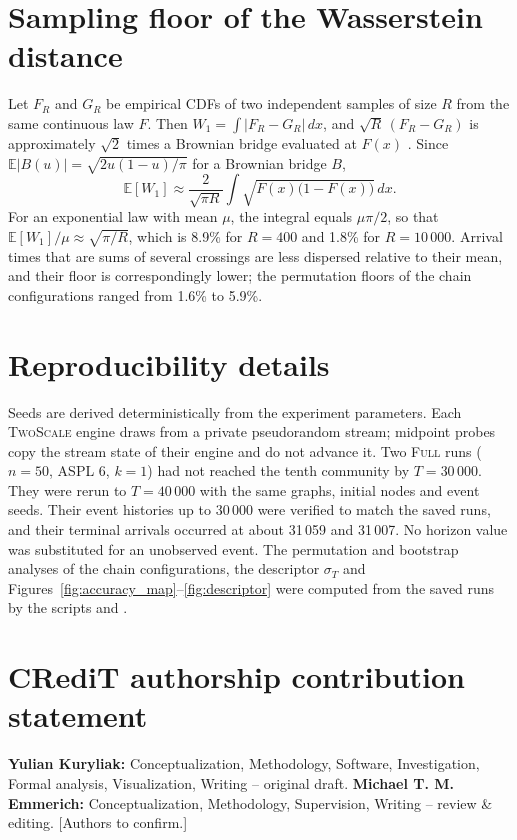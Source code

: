 \documentclass[a4paper,fleqn]{cas-sc}
\newcommand{\Full}{\textup{\textsc{Full}}}
\newcommand{\TS}{\textup{\textsc{TwoScale}}}
\begin{document}
\clearpage
\section{Sampling floor of the Wasserstein distance}
\label{app:floor}

Let $F_R$ and $G_R$ be empirical CDFs of two independent samples of size $R$ from the same continuous law $F$. Then $W_1=\int|F_R-G_R|\,dx$, and $\sqrt{R}\,(F_R-G_R)$ is approximately $\sqrt{2}$ times a Brownian bridge evaluated at $F(x)$ \citep{delbarrio1999}. Since $\mathbb{E}|B(u)|=\sqrt{2u(1-u)/\pi}$ for a Brownian bridge $B$,
\[
\mathbb{E}[W_1]\approx\frac{2}{\sqrt{\pi R}}\int\sqrt{F(x)\bigl(1-F(x)\bigr)}\,dx .
\]
For an exponential law with mean $\mu$, the integral equals $\mu\pi/2$, so that $\mathbb{E}[W_1]/\mu\approx\sqrt{\pi/R}$, which is 8.9\% for $R=400$ and 1.8\% for $R=10\,000$. Arrival times that are sums of several crossings are less dispersed relative to their mean, and their floor is correspondingly lower; the permutation floors of the chain configurations ranged from 1.6\% to 5.9\%.

\clearpage
\section{Reproducibility details}
\label{app:repro}

Seeds are derived deterministically from the experiment parameters. Each \TS{} engine draws from a private pseudorandom stream; midpoint probes copy the stream state of their engine and do not advance it. Two \Full{} runs ($n=50$, ASPL 6, $k=1$) had not reached the tenth community by $T=30\,000$. They were rerun to $T=40\,000$ with the same graphs, initial nodes and event seeds. Their event histories up to 30\,000 were verified to match the saved runs, and their terminal arrivals occurred at about 31\,059 and 31\,007. No horizon value was substituted for an unobserved event. The permutation and bootstrap analyses of the chain configurations, the descriptor $\sigma_T$ and Figures~\ref{fig:accuracy_map}--\ref{fig:descriptor} were computed from the saved runs by the scripts  and .

\section*{CRediT authorship contribution statement}
\textbf{Yulian Kuryliak:} Conceptualization, Methodology, Software, Investigation, Formal analysis, Visualization, Writing -- original draft. \textbf{Michael T. M. Emmerich:} Conceptualization, Methodology, Supervision, Writing -- review \& editing. [Authors to confirm.]
\end{document}
